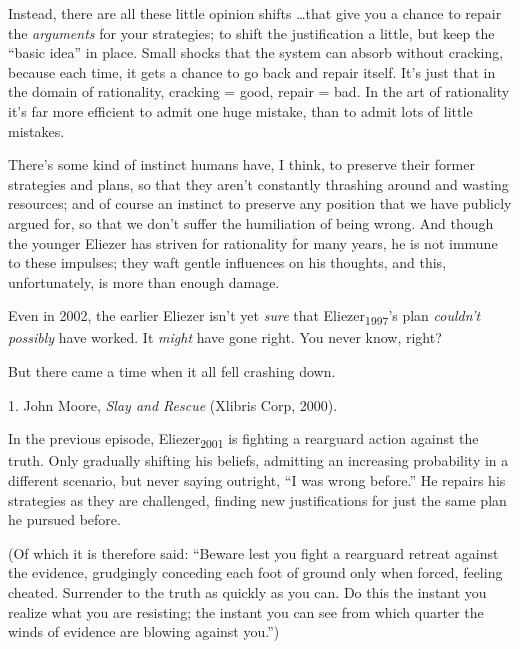 {
 Instead, there are all these little opinion shifts \ldots that give
you a chance to repair the \textit{arguments} for your strategies; to
shift the justification a little, but keep the ``basic
idea'' in place. Small shocks that the system can
absorb without cracking, because each time, it gets a chance to go back
and repair itself. It's just that in the domain of
rationality, cracking = good, repair = bad. In the art of rationality
it's far more efficient to admit one huge mistake, than
to admit lots of little mistakes.}

{
 There's some kind of instinct humans have, I
think, to preserve their former strategies and plans, so that they
aren't constantly thrashing around and wasting
resources; and of course an instinct to preserve any position that we
have publicly argued for, so that we don't suffer the
humiliation of being wrong. And though the younger Eliezer has striven
for rationality for many years, he is not immune to these impulses;
they waft gentle influences on his thoughts, and this, unfortunately,
is more than enough damage.}

{
 Even in 2002, the earlier Eliezer isn't yet
\textit{sure} that Eliezer\textsubscript{1997}'s plan
\textit{couldn't possibly} have worked. It
\textit{might} have gone right. You never know, right?}

{
 But there came a time when it all fell crashing down.}

\myendsectiontext


\bigskip

{
 1. John Moore, \textit{Slay and Rescue} (Xlibris Corp, 2000).}


{
 In the previous episode, Eliezer\textsubscript{2001} is fighting a
rearguard action against the truth. Only gradually shifting his
beliefs, admitting an increasing probability in a different scenario,
but never saying outright, ``I was wrong
before.'' He repairs his strategies as they are
challenged, finding new justifications for just the same plan he
pursued before. }

{
 (Of which it is therefore said: ``Beware lest you
fight a rearguard retreat against the evidence, grudgingly conceding
each foot of ground only when forced, feeling cheated. Surrender to the
truth as quickly as you can. Do this the instant you realize what you
are resisting; the instant you can see from which quarter the winds of
evidence are blowing against you.'')}


